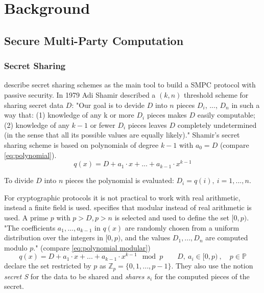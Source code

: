 \chapter{Background }
	
	\section{Secure Multi-Party Computation}

		
			
		

		\subsection*{Secret Sharing}
		
		\textcite[p. ]{Cra:1} describe secret sharing schemes as the main tool to build a \gls{SMPC} protocol with passive security. In 1979 Adi Shamir described a $(k, n)$ threshold scheme for sharing secret data $D$: "Our goal is to devide $D$ into $n$ pieces $D_i$, ..., $D_n$ in such a way that:
		(1) knowledge of any k or more $D_i$ pieces makes $D$ easily computable; (2) knowledge of any $k-1$ or fewer $D_i$ pieces leaves $D$ completely undetermined (in the sense that all its possible values are equally likely)." \autocite{Sha:1}
		Shamir's secret sharing scheme is based on polynomials of degree $k-1$ with $a_0=D$ (compare \ref{eq:polynomial}). 
		\begin{equation}
		\label{eq:polynomial}
		q(x)=D + a_1 \cdot x + ... + a_{k-1} \cdot x^{k-1}
		\end{equation}
		
		To divide $D$ into $n$ pieces the polynomial is evaluated: $D_i=q(i),\ i=1,...,n$.
		
		
		For cryptographic protocols it is not practical to work with real arithmetic, instead a finite field is used. \textcite{Sha:1} specifies that modular instead of real arithmetic is used. A prime $p$ with $p>D, p>n$ is selected and used to define the set $[0, p)$. "The coefficients $a_1, ..., a_{k-1}$ in $q(x)$ are randomly chosen	from a uniform distribution over the integers in $[0, p)$, and the values $D_1, ..., D_n$ are computed modulo $p$." \autocite[p. 613]{Sha:1} (compare \ref{eq:polynomial modular})
		\begin{equation}
		\label{eq:polynomial modular}
		q(x) = D + a_1 \cdot x + ... + a_{k-1} \cdot x^{k-1} \mod p \qquad D,\ a_i \in [0,p)\ , \quad p \in \mathbb{P}
		\end{equation}
		\textcite[p. ]{Cra:1} declare the set restricted by $p$ as $\mathbb{Z}_p = \{0, 1, ..., p-1\}$. They also use the notion \textit{secret S} for the data to be shared and \textit{shares $s_i$} for the computed pieces of the secret.
		
